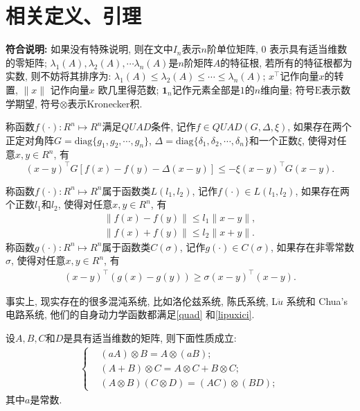 \section{相关定义、引理}
    {\bf 符合说明:} 如果没有特殊说明, 则在文中$I_n$表示$n$阶单位矩阵, $0$ 表示具有适当维数的零矩阵; $\lambda_1(A),\lambda_2(A),\cdots\lambda_n(A)$是$n$阶矩阵$A$的特征根, 若所有的特征根都为实数, 则不妨将其排序为: $\lambda_1(A)\leq\lambda_2(A)\leq\cdots\leq\lambda_n(A)$; $x^\top$记作向量$x$的转置, $\|x\|$ 记作向量$ x$ 欧几里得范数; $\mathbf{1}_n$记作元素全部是$1$的$n$维向量; 符号$\mathrm{E}$表示数学期望, 符号$\otimes$表示Kronecker积.
    \begin{defn}\label{quad}
        称函数$f(\cdot): R^n\mapsto R^n$满足$QUAD$条件, 记作$f\in QUAD(G,\Delta,\xi)$, 如果存在两个正定对角阵$G=\text{diag}\{g_1,g_2,\cdots,g_n\}$, $\Delta=\text{diag}\{\delta_1,\delta_2,\cdots,\delta_n\}$和一个正数$\xi$, 使得对任意$x,y\in R^n$, 有
        $$(x-y)^\top G[f(x)-f(y)-\Delta(x-y)]\leq-\xi(x-y)^\top G(x-y).$$
    \end{defn}
    \begin{defn}\label{lipuxici}
        称函数$f(\cdot): R^n\mapsto R^n$属于函数类$L(l_{1},l_2)$, 记作$f(\cdot)\in L(l_{1},l_2)$, 如果存在两个正数$l_{1}$和$l_2$, 使得对任意$x,y\in R^n$, 有
        \begin{align*}
            \| f(x)-f(y)\|\leq l_{1}\| x-y\|,\\
            \| f(x)+f(y)\|\leq l_{2}\| x+y\|.
        \end{align*}
        称函数$g(\cdot): R^n\mapsto R^n$属于函数类$C(\sigma)$, 记作$g(\cdot)\in C(\sigma)$, 如果存在非零常数$\sigma$, 使得对任意$x,y\in R^n$, 有
        \begin{align*}
            (x-y)^\top(g(x)-g(y))\geq \sigma(x-y)^\top(x-y).
        \end{align*}
    \end{defn}
    事实上, 现实存在的很多混沌系统, 比如洛伦兹系统, 陈氏系统, L$\ddot{u}$ 系统和 Chua's 电路系统, 他们的自身动力学函数都满足\autoref{quad} 和\autoref{lipuxici}.
    \begin{lem}\label{lem:1}{\rm{}}
        设$A,B,C$和$D$是具有适当维数的矩阵, 则下面性质成立:
        \begin{align*}
            \left\{
            \begin{aligned}
            &(aA)\otimes B=A\otimes(aB);\\
            &(A+B)\otimes C=A\otimes C+B\otimes C;\\
            &(A\otimes B)(C\otimes D)=(AC)\otimes (BD);
            \end{aligned}
            \right.
            \end{align*}
        其中$a$是常数.
    \end{lem}
